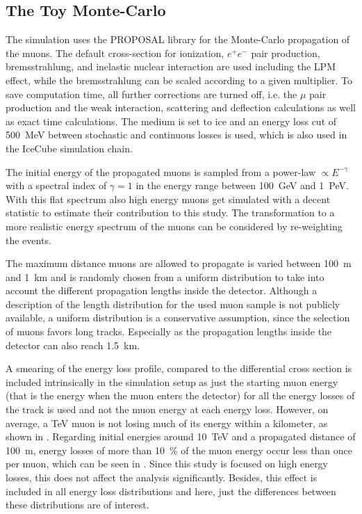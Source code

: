 %

\subsection{The Toy Monte-Carlo}

The simulation uses the PROPOSAL library for the Monte-Carlo propagation of the muons.
The default cross-section for ionization, $e^+e^-$ pair production, bremsstrahlung, and inelastic nuclear interaction are used including the LPM effect, while the bremsstrahlung can be scaled according to a given multiplier.
To save computation time, all further corrections are turned off, i.e. the $\mu$ pair production and the weak interaction, scattering and deflection calculations as well as exact time calculations.
The medium is set to ice and an energy loss cut of \SI{500}{MeV} between stochastic and continuous losses is used, which is also used in the IceCube simulation chain.

The initial energy of the propagated muons is sampled from a power-law $\propto E^{-\gamma}$ with a spectral index of $\gamma=1$ in the energy range between \SI{100}{GeV} and \SI{1}{PeV}.
With this flat spectrum also high energy muons get simulated with a decent statistic to estimate their contribution to this study.
The transformation to a more realistic energy spectrum of the muons can be considered by re-weighting the events.

The maximum distance muons are allowed to propagate is varied between \SI{100}{m} and \SI{1}{km} and is randomly chosen from a uniform distribution to take into account the different propagation lengths inside the detector.
Although a description of the length distribution for the used muon sample is not publicly available, a uniform distribution is a conservative assumption, since the selection of muons favors long tracks.
Especially as the propagation lengths inside the detector can also reach \SI{1.5}{km}.

A smearing of the energy loss profile, compared to the differential cross section is included intrinsically in the simulation setup as just the starting muon energy (that is the energy when the muon enters the detector) for all the energy losses of the track is used and not the muon energy at each energy loss.
However, on average, a TeV muon is not losing much of its energy within a kilometer, as shown in .
Regarding initial energies around \SI{10}{TeV} and a propagated distance of \SI{100}{m}, energy losses of more than \SI{10}{\%} of the muon energy occur less than once per muon, which can be seen in .
Since this study is focused on high energy losses, this does not affect the analysis significantly. 
Besides, this effect is included in all energy loss distributions and here, just the differences between these distributions are of interest.


